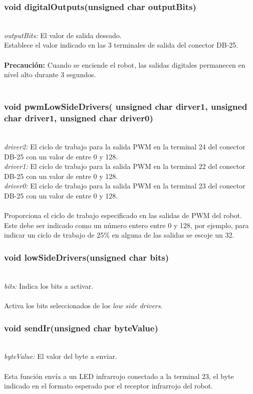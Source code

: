 \documentclass[letterpaper]{book}
\begin{document}
\subsubsection{void digitalOutputs(unsigned char outputBits)}\mbox{}\\
\emph{outputBits: } El valor de salida deseado.\\
Establece el valor indicado en las 3 terminales de salida del conector DB-25.\\\\
\textbf{Precaución: }Cuando se enciende el robot, las salidas digitales permanecen en nivel alto durante 3 segundos.\\\\

\subsubsection{	void pwmLowSideDrivers( unsigned char dirver1, unsigned char driver1, unsigned char driver0)}\mbox{}\\
\emph{driver2: } El ciclo de trabajo para la salida PWM en la terminal 24 del conector DB-25 con un valor de entre 0 y 128.\\
\emph{driver1: } El ciclo de trabajo para la salida PWM en la terminal 22 del conector DB-25 con un valor de entre 0 y 128.\\
\emph{driver0: } El ciclo de trabajo para la salida PWM en la terminal 23 del conector DB-25 con un valor de entre 0 y 128.\\\\

Proporciona el ciclo de trabajo especificado en las salidas de PWM del robot. Este debe ser indicado como un número entero entre 0 y 128, por ejemplo, para indicar un ciclo de trabajo de 25\% en alguna de las salidas se escoje un 32.\\

\subsubsection{void lowSideDrivers(unsigned char bits)}\mbox{}\\
\emph{bits: } Indica los bits a activar.\\\\
Activa los bits seleccionados de los \emph{low side drivers}.

\subsubsection{void sendIr(unsigned char byteValue)}\mbox{}\\
\emph{byteValue: }El valor del byte  a enviar.\\\\
Esta función envía a un LED infrarrojo conectado a la terminal 23, el byte indicado en el formato esperado por el receptor infrarrojo del robot.\\
\end{document}
